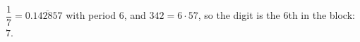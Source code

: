 $\dfrac17=0.\overline{142857}$ with period $6$, and $342=6\cdot57$, so the digit is the $6$th in the block: $\boxed{7}$.
